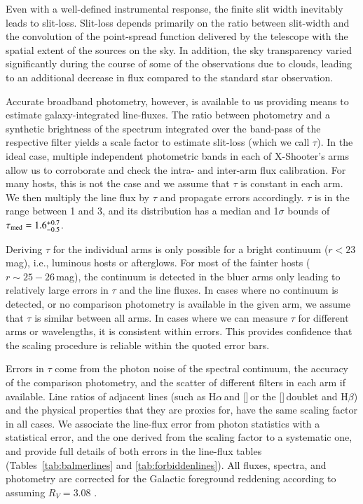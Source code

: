 \documentclass[traditabstract, longauth]{aa}
\newcommand{\hb}{H$\beta$}
\newcommand{\ha}{H$\alpha$}
\newcommand{\oiii}{[\ion{O}{iii}]}
\newcommand{\nii}{[\ion{N}{ii}]}
\begin{document}
Even with a well-defined instrumental response, the finite slit width inevitably leads to slit-loss. Slit-loss depends primarily on the ratio between slit-width and the convolution of the point-spread function delivered by the telescope with the spatial extent of the sources on the sky. In addition, the sky transparency varied significantly during the course of some of the observations due to clouds, leading to an additional decrease in flux compared to the standard star observation.

Accurate broadband photometry, however, is available to us providing means to estimate galaxy-integrated line-fluxes. The ratio between photometry and a synthetic brightness of the spectrum integrated over the band-pass of the respective filter yields a scale factor to estimate slit-loss (which we call $\tau$). In the ideal case, multiple independent photometric bands in each of X-Shooter's arms allow us to corroborate and check the intra- and inter-arm flux calibration. For many hosts, this is not the case and we assume that $\tau$ is constant in each arm. We then multiply the line flux by $\tau$ and propagate errors accordingly. $\tau$ is in the range between 1 and 3, and its distribution has a median and 1$\sigma$ bounds of $\tau_{\rm {med}} = 1.6_{-0.5}^{+0.7}$. 

Deriving $\tau$ for the individual arms is only possible for a bright continuum ($r<23$\,mag), i.e., luminous hosts or afterglows. For most of the fainter hosts ($r\sim25-26$\,mag), the continuum is detected in the bluer arms only leading to relatively large errors in $\tau$ and the line fluxes. In cases where no continuum is detected, or no comparison photometry is available in the given arm, we assume that $\tau$ is similar between all arms. In cases where we can measure $\tau$ for different arms or wavelengths, it is consistent within errors. This provides confidence that the scaling procedure is reliable within the quoted error bars.

Errors in $\tau$ come from the photon noise of the spectral continuum, the accuracy of the comparison photometry, and the scatter of different filters in each arm if available. Line ratios of adjacent lines (such as \ha\,and \nii\,or the \oiii\,doublet and \hb) and the physical properties that they are proxies for, have the same scaling factor in all cases. We associate the line-flux error from photon statistics with a statistical error, and the one derived from the scaling factor to a systematic one, and provide full details of both errors in the line-flux tables (Tables~\ref{tab:balmerlines} and \ref{tab:forbiddenlines}). All fluxes, spectra, and photometry are corrected for the Galactic foreground reddening according to \citet{2011ApJ...737..103S} assuming $R_V=3.08$ \citep{1992ApJ...395..130P}.
\end{document}
